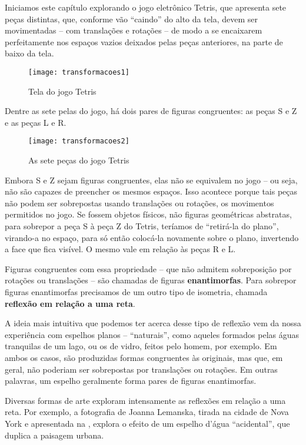 
Iniciamos este capítulo explorando o jogo eletrônico Tetris, que apresenta sete peças distintas, que, conforme vão “caindo” do alto da tela, devem ser movimentadas – com translações e rotações – de modo a se encaixarem perfeitamente nos espaços vazios deixados pelas peças anteriores, na parte de baixo da tela. 

\begin{figure}[H]
\centering

\texttt{[image: transformacoes1]}
\caption{Tela do jogo Tetris}
\label{}
\end{figure}

Dentre as sete pelas do jogo, há dois pares de figuras congruentes: as peças S e Z e as peças L e R. 

\begin{figure}[H]
\centering

\texttt{[image: transformacoes2]}
\caption{As sete peças do jogo Tetris}
\label{}
\end{figure}

Embora S e Z sejam figuras congruentes, elas não se equivalem no jogo – ou seja, não são capazes de preencher os mesmos espaços. Isso acontece porque tais peças não podem ser sobrepostas usando translações ou rotações, os movimentos permitidos no jogo. Se fossem objetos físicos, não figuras geométricas abstratas, para sobrepor a peça S à peça Z do Tetris, teríamos de “retirá-la do plano”, virando-a no espaço, para só então colocá-la novamente sobre o plano, invertendo a face que fica visível. O mesmo vale em relação às peças R e L.

Figuras congruentes com essa propriedade – que não admitem sobreposição por rotações ou translações – são chamadas de figuras \textbf{enantimorfas}.  Para sobrepor figuras enantimorfas precisamos de um outro tipo de isometria, chamada \textbf{reflexão em relação a uma reta}. 
	
A ideia mais intuitiva que podemos ter acerca desse tipo de reflexão vem da nossa experiência com espelhos planos – “naturais”, como aqueles formados pelas águas tranquilas de um lago, ou os de vidro, feitos pelo homem, por exemplo. Em ambos os casos, são produzidas formas congruentes às originais, mas que, em geral, não poderiam ser sobrepostas por translações ou rotações. Em outras palavras, um espelho geralmente forma pares de figuras enantimorfas. 
	
Diversas formas de arte exploram intensamente as reflexões em relação a uma reta. Por exemplo, a fotografia de Joanna Lemanska, tirada na cidade de Nova York e apresentada na , explora o efeito de um espelho d’água “acidental”, que duplica a paisagem urbana.

